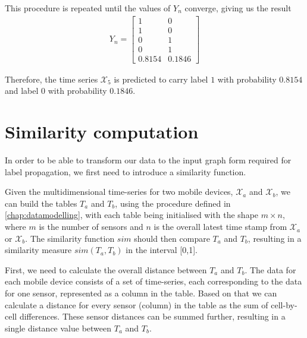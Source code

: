\begin{example}
    This procedure is repeated until the values of $Y_n$ converge, giving us the result
    \begin{align*}
        Y_n =
        \begin{bmatrix}
            1      & 0      \\
            1      & 0      \\
            0      & 1      \\
            0      & 1      \\
            0.8154 & 0.1846
        \end{bmatrix}
    \end{align*}
    
    Therefore, the time series $\mathcal{X}_5$ is predicted to carry label $1$ with probability $0.8154$ and label $0$ with probability $0.1846$.
\end{example}

\section{Similarity computation}
\label{similarity_computation}
\par
In order to be able to transform our data to the input graph form required for label propagation, we first need to introduce a similarity function.
\par
\medskip
Given the multidimensional time-series for two mobile devices, $\mathcal{X}_a$ and $\mathcal{X}_b$, we can build the tables $T_a$ and $T_b$, using the procedure defined in \cref{chap:datamodelling}, with each table being initialised with the shape $m \times n$, where $m$ is the number of sensors and $n$ is the overall latest time stamp from $\mathcal{X}_a$ or $\mathcal{X}_b$. The similarity function $sim$ should then compare $T_a$ and $T_b$, resulting in a similarity measure $sim(T_a,T_b)$ in the interval [0,1].
\par
\medskip
\par
First, we need to calculate the overall distance between $T_a$ and $T_b$. The data for each mobile device consists of a set of time-series, each corresponding to the data for one sensor, represented as a column in the table. Based on that we can calculate a distance for every sensor (column) in the table as the sum of cell-by-cell differences. These sensor distances can be summed further, resulting in a single distance value between $T_a$ and $T_b$.\\

